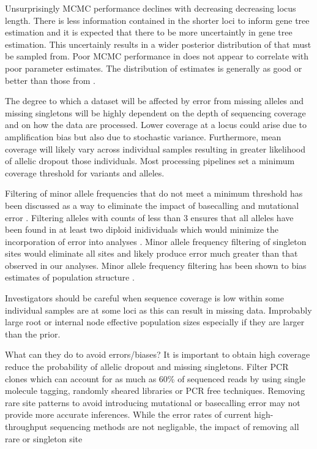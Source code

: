 Unsurprisingly MCMC performance declines with decreasing decreasing locus length.
There is less information contained in the shorter loci to inform gene tree estimation 
and it is expected that there to be more uncertaintly in gene tree estimation.
This uncertainly results in a wider posterior distribution of that must be 
sampled from.
Poor MCMC performance in \beast does not appear to correlate with poor parameter 
estimates. The distribution of estimates is generally as good or better than those 
from \ecoevolity. 


The degree to which a dataset will be affected by error from missing alleles 
and missing singletons will be highly dependent on the depth of sequencing coverage
and on how the data are processed. Lower coverage at a locus could arise due 
to amplification bias but also due to stochastic variance. Furthermore,
mean coverage will likely vary across individual samples resulting in greater 
likelihood of allelic dropout those individuals. Most processing pipelines set 
a minimum coverage threshold for variants and alleles. 

Filtering of minor allele frequencies that do not meet a minimum threshold has 
been discussed as a way to eliminate the impact of basecalling and mutational 
error \citep{linckMinorAlleleFrequency2019}.
Filtering alleles with counts of less than 3 ensures that all alleles have been 
found in at least two diploid inidividuals which would minimize the incorporation 
of error into analyses \citep{rochetteStacksAnalyticalMethods2019}.
Minor allele frequency filtering of singleton sites would eliminate all sites 
and likely produce error much greater than that observed in our analyses.
Minor allele frequency filtering has been shown to bias estimates of population 
structure \citep{linckMinorAlleleFrequency2019}.


Investigators should be careful when sequence coverage is low within some
individual samples are at some loci as this can result in missing data.
Improbably large root or internal node effective population sizes especially if 
they are larger than the prior. 


What can they do to avoid errors/biases?
It is important to obtain high coverage reduce the probability of allelic dropout
and missing singletons. 
Filter PCR clones which can account for as much as 60\% of sequenced reads 
\citep{andrewsHarnessingPowerRADseq2016, smithBiasedEstimatesClonal2014} by using single molecule tagging, randomly sheared libraries or PCR free
techniques.
Removing rare site patterns to avoid introducing mutational or basecalling error 
may not provide more accurate inferences. While the error rates of current 
high-throughput sequencing methods are not negligable, the impact of removing 
all rare or singleton site  


